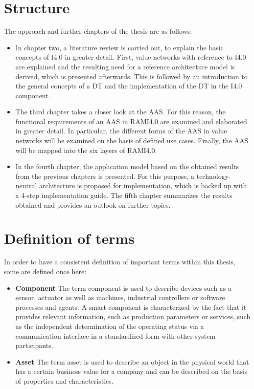 \section{Structure}
The approach and further chapters of the thesis are as follows:
\begin{itemize}
    \item[] In chapter two, a literature review is carried out, to explain the basic concepts of \ac{I4.0} in greater detail. First, value networks with reference to \ac{I4.0} are explained and the resulting need for a reference architecture model is derived, which is presented afterwards. This is followed by an introduction to the general concepts of a \ac{DT} and the implementation of the \ac{DT} in the \ac{I4.0} component.
    
    \item[] The third chapter takes a closer look at the \ac{AAS}. For this reason, the functional requirements of an \ac{AAS} in \ac{RAMI4.0} are examined and elaborated in greater detail. In particular, the different forms of the \ac{AAS} in value networks will be examined on the basis of defined use cases. Finally, the \ac{AAS} will be mapped into the six layers of \ac{RAMI4.0}.
    
    \item[] In the fourth chapter, the application model based on the obtained results from the previous chapters is presented. For this purpose, a technology-neutral architecture is proposed for implementation, which is backed up with a 4-step implementation guide. The fifth chapter summarizes the results obtained and provides an outlook on further topics. 
\end{itemize}


\section{Definition of terms}
In order to have a consistent definition of important terms within this thesis, some are defined once here:
\begin{itemize}
    \item[] \textbf{Component} The term component is used to describe devices such as a sensor, actuator as well as machines, industrial controllers or software processes and agents. A smart component is characterized by the fact that it provides relevant information, such as production parameters or services, such as the independent determination of the operating status via a communication interface in a standardized form with other system participants.
    \item[] \textbf{Asset} The term asset is used to describe an object in the physical world that has a certain business value for a company and can be described on the basis of properties and characteristics.
\end{itemize}